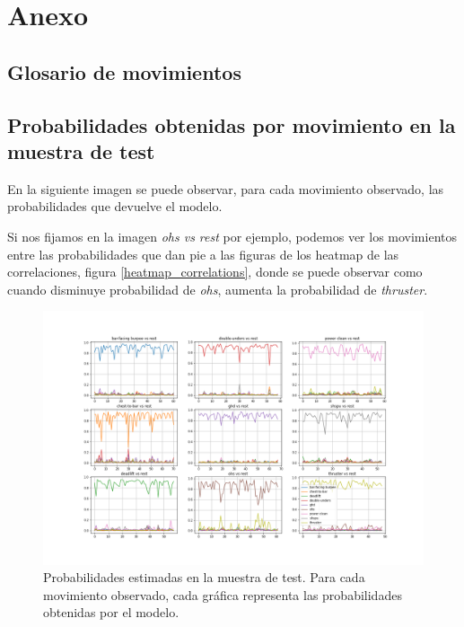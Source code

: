 \chapter{Anexo}

\section{Glosario de movimientos}



\section{Probabilidades obtenidas por movimiento en la muestra de test}\label{Probabilidades}

En la siguiente imagen se puede observar, para cada movimiento observado, las probabilidades que devuelve el modelo.

Si nos fijamos en la imagen \textit{ohs vs rest} por ejemplo, podemos ver los movimientos entre las probabilidades que dan pie a las figuras de los heatmap de las correlaciones, figura \ref{heatmap_correlations}, donde se puede observar como cuando disminuye probabilidad de \textit{ohs}, aumenta la probabilidad de \textit{thruster}.

\begin{figure}[H]
    \centering
		\includegraphics[width=\textwidth]{figs/probabilities_by_movement.png}
\caption{Probabilidades estimadas en la muestra de test. Para cada movimiento observado, cada gráfica representa las probabilidades obtenidas por el modelo.}\label{probabilities_by_movement}
\end{figure}




